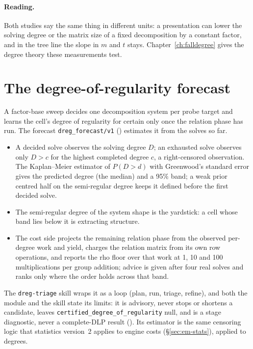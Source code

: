 \paragraph{Reading.} Both studies say the same thing in different units: a
presentation can lower the solving degree or the matrix size of a fixed
decomposition by a constant factor, and in the tree line the slope in $m$ and
$t$ stays. Chapter~\ref{ch:falldegree} gives the degree theory these
measurements test.

\section{The degree-of-regularity forecast}\label{sec:in-forecast}

A factor-base sweep decides one decomposition system per probe target and
learns the cell's degree of regularity for certain only once the relation
phase has run. The forecast \texttt{dreg\_forecast/v1}
() estimates it from the solves so
far.
\begin{itemize}
\item A decided solve observes the solving degree $D$; an exhausted solve
  observes only $D>c$ for the highest completed degree $c$, a
  right-censored observation. The Kaplan--Meier estimator of $P(D>d)$ with
  Greenwood's standard error gives the predicted degree (the median) and a
  95\% band; a weak prior centred half on the semi-regular degree keeps it
  defined before the first decided solve.
\item The semi-regular degree of the system shape is the yardstick: a cell
  whose band lies below it is extracting structure.
\item The cost side projects the remaining relation phase from the
  observed per-degree work and yield, charges the relation matrix from its
  own row operations, and reports the rho floor over that work at 1, 10 and
  100 multiplications per group addition; advice is given after four real
  solves and ranks only where the order holds across that band.
\end{itemize}
The \texttt{dreg-triage} skill wraps it as a loop (plan, run, triage, refine),
and both the module and the skill state its limits: it is advisory, never
stops or shortens a candidate, leaves \texttt{certified\_degree\_of\_regularity}
null, and is a stage diagnostic, never a complete-DLP result
(). Its estimator is the same
censoring logic that statistics version~2 applies to engine costs
(\S\ref{sec:em-stats}), applied to degrees.

